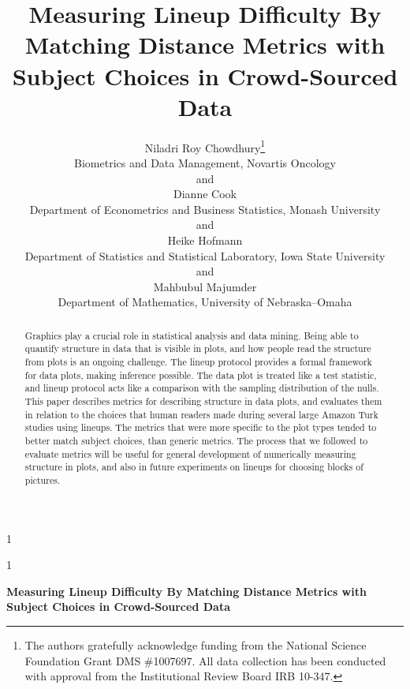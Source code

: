 \documentclass[12pt]{article}\usepackage[]{graphicx}\usepackage[]{color}
\newcommand{\blind}{1}
\begin{document}
%

\def\spacingset#1{\renewcommand{\baselinestretch}%
{#1}\small\normalsize} \spacingset{1}



\blind
{
  \title{\bf Measuring Lineup Difficulty By Matching Distance Metrics with Subject Choices in Crowd-Sourced Data}
\author{Niladri Roy Chowdhury\thanks{
    The authors gratefully acknowledge funding from the National Science Foundation Grant DMS \#1007697. All data collection has been conducted with approval from the Institutional Review Board IRB 10-347.}\hspace{.2cm}\\
    Biometrics and Data Management, Novartis Oncology\\
    and \\
    Dianne Cook\\
    Department of Econometrics and Business Statistics, Monash University \\
    and\\
    Heike Hofmann\\
    Department of Statistics and Statistical Laboratory, Iowa State University\\
    and\\
    Mahbubul Majumder\\
    Department of Mathematics, University of Nebraska--Omaha\\}
  \maketitle
} \fi

\blind
{
  \bigskip
  \bigskip
  \bigskip
  \begin{center}
    {\LARGE\bf  Measuring Lineup Difficulty By Matching Distance Metrics with Subject Choices in Crowd-Sourced Data}
\end{center}
  \medskip
} \fi

\bigskip
\begin{abstract}
Graphics play a crucial role in statistical analysis and data mining. Being able to quantify structure in data that is visible in plots, and how people read the structure from plots is an ongoing challenge. The lineup protocol provides a formal framework for data plots, making inference possible. The data plot is treated like a test statistic, and lineup protocol acts like a comparison with the sampling distribution of the nulls. This paper describes metrics for describing structure in data plots, and evaluates them in relation to the choices that human readers made during several large Amazon Turk studies using lineups. The metrics that were more specific to the plot types tended to better match subject choices, than generic metrics. The process that we followed to evaluate metrics will be useful for general development of numerically measuring structure in plots, and also in future experiments on lineups for choosing blocks of pictures.
\end{abstract}
\end{document}
